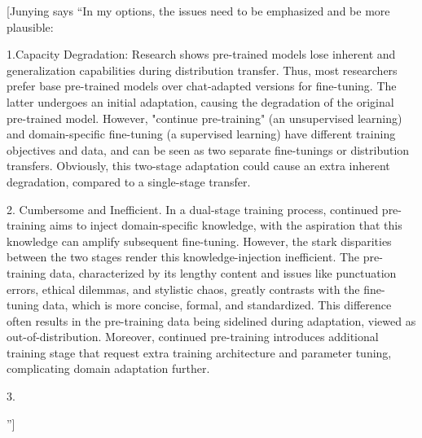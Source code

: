 \documentclass{article} %
\newcommand{\junying}[1]{{ \color{teal} [Junying says ``#1'']}}
\begin{document}
\junying{In my options, the issues need to be emphasized and be more plausible:

1.Capacity Degradation: Research shows pre-trained models lose inherent and generalization capabilities during distribution transfer. Thus, most researchers prefer base pre-trained models over chat-adapted versions for fine-tuning. The latter undergoes an initial adaptation, causing the degradation of the original pre-trained model. However, "continue pre-training" (an unsupervised learning) and domain-specific fine-tuning (a supervised learning) have different training objectives and data, and can be seen as two separate fine-tunings or distribution transfers. Obviously, this two-stage adaptation could cause an extra inherent degradation, compared to a single-stage transfer.


2. Cumbersome and Inefficient. In a dual-stage training process, continued pre-training aims to inject domain-specific knowledge, with the aspiration that this knowledge can amplify subsequent fine-tuning. However, the stark disparities between the two stages render this knowledge-injection inefficient. The pre-training data, characterized by its lengthy content and issues like punctuation errors, ethical dilemmas, and stylistic chaos, greatly contrasts with the fine-tuning data, which is more concise, formal, and standardized. This difference often results in the pre-training data being sidelined during adaptation, viewed as out-of-distribution. Moreover, continued pre-training introduces additional training stage that request extra training architecture and parameter tuning, complicating domain adaptation further.

3. 

}
\end{document}
